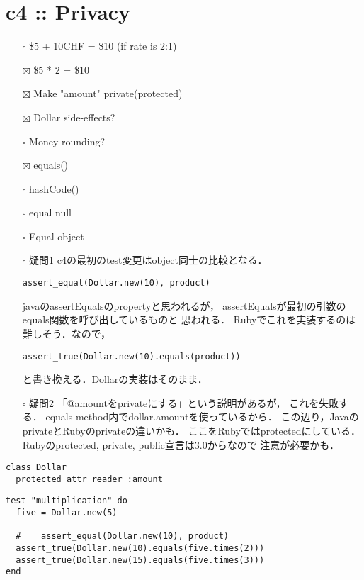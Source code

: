 \documentclass[11pt]{article}
\begin{document}
\section{c4 :: Privacy}
\label{sec:org17877cb}
\begin{itemize}
\item[{$\square$}] \$5 + 10CHF = \$10 (if rate is 2:1)
\item[{$\boxtimes$}] \$5 * 2 = \$10
\item[{$\boxtimes$}] Make "amount" private(protected)
\item[{$\boxtimes$}] Dollar side-effects?
\item[{$\square$}] Money rounding?
\item[{$\boxtimes$}] equals()
\item[{$\square$}] hashCode()
\item[{$\square$}] equal null
\item[{$\square$}] Equal object

\item[{$\square$}] 疑問1
c4の最初のtest変更はobject同士の比較となる．
\begin{verbatim}
assert_equal(Dollar.new(10), product)
\end{verbatim}

javaのassertEqualsのpropertyと思われるが，
assertEqualsが最初の引数のequals関数を呼び出しているものと
思われる．
Rubyでこれを実装するのは難しそう．なので，
\begin{verbatim}
assert_true(Dollar.new(10).equals(product))
\end{verbatim}

と書き換える．Dollarの実装はそのまま．

\item[{$\square$}] 疑問2
「@amountをprivateにする」という説明があるが，
これを失敗する．
equals method内でdollar.amountを使っているから．
この辺り，JavaのprivateとRubyのprivateの違いかも．
ここをRubyではprotectedにしている．
Rubyのprotected, private, public宣言は3.0からなので
注意が必要かも．
\end{itemize}

\begin{verbatim}
class Dollar
  protected attr_reader :amount
\end{verbatim}

\begin{verbatim}
test "multiplication" do
  five = Dollar.new(5)

  #    assert_equal(Dollar.new(10), product)
  assert_true(Dollar.new(10).equals(five.times(2)))
  assert_true(Dollar.new(15).equals(five.times(3)))
end
\end{verbatim}
\end{document}
